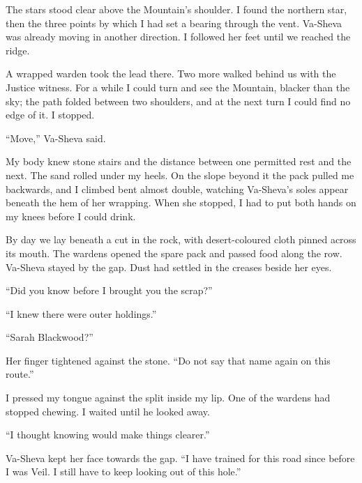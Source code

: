 \ornament

The stars stood clear above the Mountain's shoulder. I found the northern star, then the three points by which I had set a bearing through the vent. Va-Sheva was already moving in another direction. I followed her feet until we reached the ridge.\par

A wrapped warden took the lead there. Two more walked behind us with the Justice witness. For a while I could turn and see the Mountain, blacker than the sky; the path folded between two shoulders, and at the next turn I could find no edge of it. I stopped.\par

``Move,'' Va-Sheva said.\par

My body knew stone stairs and the distance between one permitted rest and the next. The sand rolled under my heels. On the slope beyond it the pack pulled me backwards, and I climbed bent almost double, watching Va-Sheva's soles appear beneath the hem of her wrapping. When she stopped, I had to put both hands on my knees before I could drink.\par

By day we lay beneath a cut in the rock, with desert-coloured cloth pinned across its mouth. The wardens opened the spare pack and passed food along the row. Va-Sheva stayed by the gap. Dust had settled in the creases beside her eyes.\par

``Did you know before I brought you the scrap?''\par

``I knew there were outer holdings.''\par

``Sarah Blackwood?''\par

Her finger tightened against the stone. ``Do not say that name again on this route.''\par

I pressed my tongue against the split inside my lip. One of the wardens had stopped chewing. I waited until he looked away.\par

``I thought knowing would make things clearer.''\par

Va-Sheva kept her face towards the gap. ``I have trained for this road since before I was Veil. I still have to keep looking out of this hole.''\par

